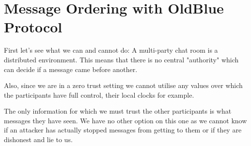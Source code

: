 \section{Message Ordering with OldBlue Protocol}
First let's see what we can and cannot do:
A multi-party chat room is a distributed environment.
This means that there is no central "authority" which can decide if a message came before another.

Also, since we are in a zero trust setting we cannot utilise any values over which the participants have full control, their local clocks for example.

The only information for which we must trust the other participants is what messages they have seen.
We have no other option on this one as we cannot know if an attacker has actually stopped messages from getting to them or if they are dishonest and lie to us.

